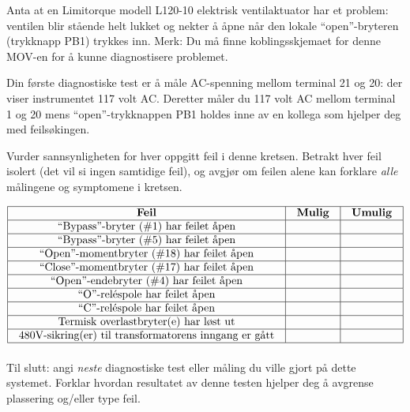 

Anta at en Limitorque modell L120-10 elektrisk ventilaktuator har et problem: ventilen blir stående helt lukket og nekter å åpne når den lokale ``open''-bryteren (trykknapp PB1) trykkes inn. Merk: Du må finne koblingsskjemaet for denne MOV-en for å kunne diagnostisere problemet.

Din første diagnostiske test er å måle AC-spenning mellom terminal 21 og 20: der viser instrumentet 117 volt AC. Deretter måler du 117 volt AC mellom terminal 1 og 20 mens ``open''-trykknappen PB1 holdes inne av en kollega som hjelper deg med feilsøkingen.

Vurder sannsynligheten for hver oppgitt feil i denne kretsen. Betrakt hver feil isolert (det vil si ingen samtidige feil), og avgjør om feilen alene kan forklare {\it alle} målingene og symptomene i kretsen.


$$\vbox{\offinterlineskip
\halign{\strut
\vrule \quad\hfil # \ \hfil & 
\vrule \quad\hfil # \ \hfil & 
\vrule \quad\hfil # \ \hfil \vrule \cr
\noalign{\hrule}
%
{\bf Feil} & {\bf Mulig} & {\bf Umulig} \cr
%
\noalign{\hrule}
%
``Bypass''-bryter (\#1) har feilet åpen &  &  \cr
%
\noalign{\hrule}
%
``Bypass''-bryter (\#5) har feilet åpen &  &  \cr
%
\noalign{\hrule}
%
``Open''-momentbryter (\#18) har feilet åpen &  &  \cr
%
\noalign{\hrule}
%
``Close''-momentbryter (\#17) har feilet åpen &  &  \cr
%
\noalign{\hrule}
%
``Open''-endebryter (\#4) har feilet åpen &  &  \cr
%
\noalign{\hrule}
%
``O''-reléspole har feilet åpen &  &  \cr
%
\noalign{\hrule}
%
``C''-reléspole har feilet åpen &  &  \cr
%
\noalign{\hrule}
%
Termisk overlastbryter(e) har løst ut &  &  \cr
%
\noalign{\hrule}
%
480V-sikring(er) til transformatorens inngang er gått &  &  \cr
%
\noalign{\hrule}
} %
}$$ %

Til slutt: angi {\it neste} diagnostiske test eller måling du ville gjort på dette systemet. Forklar hvordan resultatet av denne testen hjelper deg å avgrense plassering og/eller type feil.

